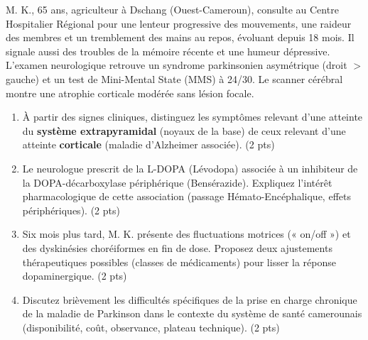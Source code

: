 \documentclass[11pt]{article}
\begin{document}
\begin{exercice}
M. K., 65 ans, agriculteur à Dschang (Ouest-Cameroun), consulte au Centre Hospitalier Régional pour une lenteur progressive des mouvements, une raideur des membres et un tremblement des mains au repos, évoluant depuis 18 mois. Il signale aussi des troubles de la mémoire récente et une humeur dépressive. L'examen neurologique retrouve un syndrome parkinsonien asymétrique (droit $>$ gauche) et un test de Mini-Mental State (MMS) à 24/30. Le scanner cérébral montre une atrophie corticale modérée sans lésion focale.
\begin{enumerate}
    \item À partir des signes cliniques, distinguez les symptômes relevant d'une atteinte du \textbf{système extrapyramidal} (noyaux de la base) de ceux relevant d'une atteinte \textbf{corticale} (maladie d'Alzheimer associée). (2 pts)
    \item Le neurologue prescrit de la L-DOPA (Lévodopa) associée à un inhibiteur de la DOPA-décarboxylase périphérique (Bensérazide). Expliquez l'intérêt pharmacologique de cette association (passage Hémato-Encéphalique, effets périphériques). (2 pts)
    \item Six mois plus tard, M. K. présente des fluctuations motrices (« on/off ») et des dyskinésies choréiformes en fin de dose. Proposez deux ajustements thérapeutiques possibles (classes de médicaments) pour lisser la réponse dopaminergique. (2 pts)
    \item Discutez brièvement les difficultés spécifiques de la prise en charge chronique de la maladie de Parkinson dans le contexte du système de santé camerounais (disponibilité, coût, observance, plateau technique). (2 pts)
\end{enumerate}
\end{exercice}
\end{document}
